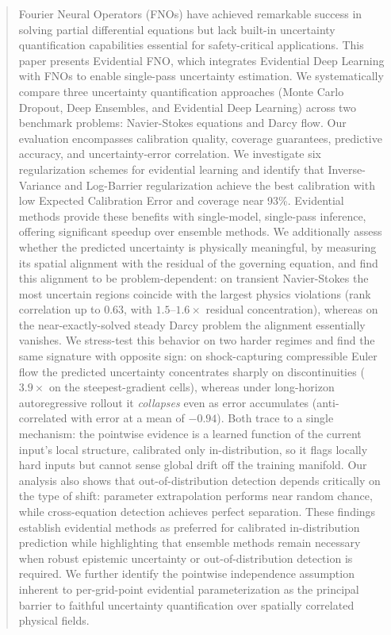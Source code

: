 \begin{abstract}
Fourier Neural Operators (FNOs) have achieved remarkable success in solving partial differential equations 
but lack built-in uncertainty quantification capabilities essential for safety-critical applications. 
This paper presents Evidential FNO, which integrates Evidential Deep Learning with FNOs to enable single-pass 
uncertainty estimation. We systematically compare three uncertainty quantification approaches 
(Monte Carlo Dropout, Deep Ensembles, and Evidential Deep Learning) across two benchmark problems: Navier-Stokes 
equations and Darcy flow. Our evaluation encompasses calibration quality, coverage guarantees, predictive accuracy, 
and uncertainty-error correlation. We investigate six regularization schemes for evidential learning and
identify that Inverse-Variance and Log-Barrier regularization achieve the best calibration with low Expected
Calibration Error and coverage near 93\%. Evidential methods provide these benefits with single-model,
single-pass inference, offering significant speedup over ensemble methods. We additionally assess whether the
predicted uncertainty is physically meaningful, by measuring its spatial alignment with the residual of the
governing equation, and find this alignment to be problem-dependent: on transient Navier-Stokes the most
uncertain regions coincide with the largest physics violations (rank correlation up to 0.63, with
$1.5$--$1.6\times$ residual concentration), whereas on the near-exactly-solved steady Darcy problem the
alignment essentially vanishes.
We stress-test this behavior on two harder regimes and find the same signature with opposite sign: on
shock-capturing compressible Euler flow the predicted uncertainty concentrates sharply on discontinuities
($3.9\times$ on the steepest-gradient cells), whereas under long-horizon autoregressive rollout it
\emph{collapses} even as error accumulates (anti-correlated with error at a mean of $-0.94$). Both trace to a
single mechanism: the pointwise evidence is a learned function of the current input's local structure,
calibrated only in-distribution, so it flags locally hard inputs but cannot sense global drift off the training
manifold. Our analysis also shows that out-of-distribution detection depends critically on the type of shift:
parameter extrapolation performs near random chance, while cross-equation detection achieves perfect
separation. These findings establish evidential methods as preferred for calibrated in-distribution prediction
while highlighting that ensemble methods remain necessary when robust epistemic uncertainty or out-of-distribution
detection is required. We further identify the pointwise independence assumption inherent to per-grid-point
evidential parameterization as the principal barrier to faithful uncertainty quantification over spatially
correlated physical fields.
\end{abstract}
